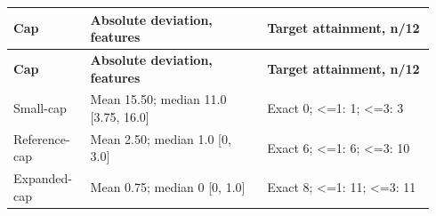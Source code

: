 {
\small
\renewcommand{\arraystretch}{1.08}
\setlength{\tabcolsep}{2.2pt}
\renewcommand{\theHtable}{suppanel.31}%
\begin{longtable}{@{}>{\raggedright\arraybackslash}p{0.1747\linewidth}>{\raggedright\arraybackslash}p{0.3917\linewidth}>{\raggedright\arraybackslash}p{0.3736\linewidth}@{}}
\toprule
\bfseries Cap & \bfseries Absolute deviation, features & \bfseries Target attainment, n/12 \\
\midrule
\endfirsthead
\toprule
\bfseries Cap & \bfseries Absolute deviation, features & \bfseries Target attainment, n/12 \\
\midrule
\endhead
\bottomrule
\endfoot
Small-cap & Mean 15.50; median 11.0 [3.75, 16.0] & Exact 0; <=1: 1; <=3: 3 \\
Reference-cap & Mean 2.50; median 1.0 [0, 3.0] & Exact 6; <=1: 6; <=3: 10 \\
Expanded-cap & Mean 0.75; median 0 [0, 1.0] & Exact 8; <=1: 11; <=3: 11 \\
\end{longtable}
\addtocounter{table}{-1}%
}

